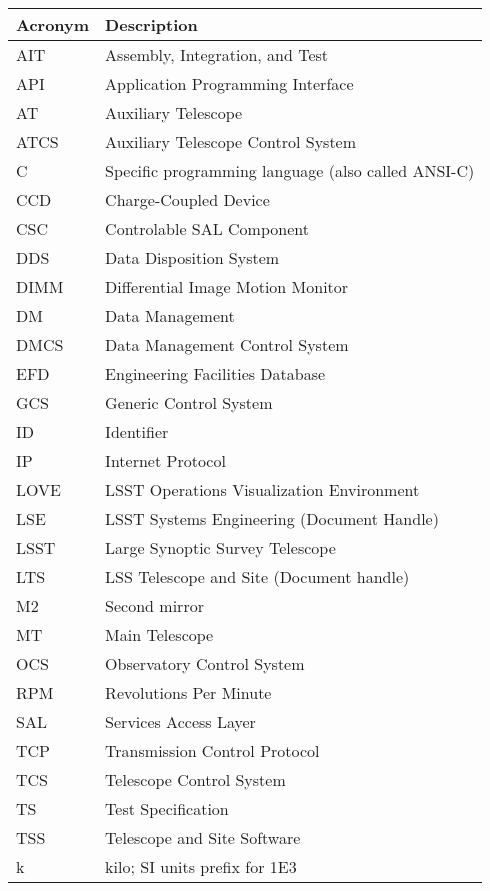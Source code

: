 \addtocounter{table}{-1}
\begin{longtable}{|l|p{}|}\hline
\textbf{Acronym} & \textbf{Description}  \\\hline

AIT & Assembly, Integration, and Test \\\hline
API & Application Programming Interface \\\hline
AT & Auxiliary Telescope \\\hline
ATCS & Auxiliary Telescope Control System \\\hline
C & Specific programming language (also called ANSI-C) \\\hline
CCD & Charge-Coupled Device \\\hline
CSC & Controlable SAL Component \\\hline
DDS & Data Disposition System \\\hline
DIMM & Differential Image Motion Monitor \\\hline
DM & Data Management \\\hline
DMCS & Data Management Control System \\\hline
EFD & Engineering Facilities Database \\\hline
GCS & Generic Control System \\\hline
ID & Identifier \\\hline
IP & Internet Protocol \\\hline
LOVE & LSST Operations Visualization Environment \\\hline
LSE & LSST Systems Engineering (Document Handle) \\\hline
LSST & Large Synoptic Survey Telescope \\\hline
LTS & LSS Telescope and Site (Document handle) \\\hline
M2 & Second mirror \\\hline
MT & Main Telescope \\\hline
OCS & Observatory Control System \\\hline
RPM & Revolutions Per Minute \\\hline
SAL & Services Access Layer \\\hline
TCP & Transmission Control Protocol \\\hline
TCS & Telescope Control System \\\hline
TS & Test Specification \\\hline
TSS & Telescope and Site Software \\\hline
k & kilo; SI units prefix for 1E3 \\\hline
\end{longtable}
